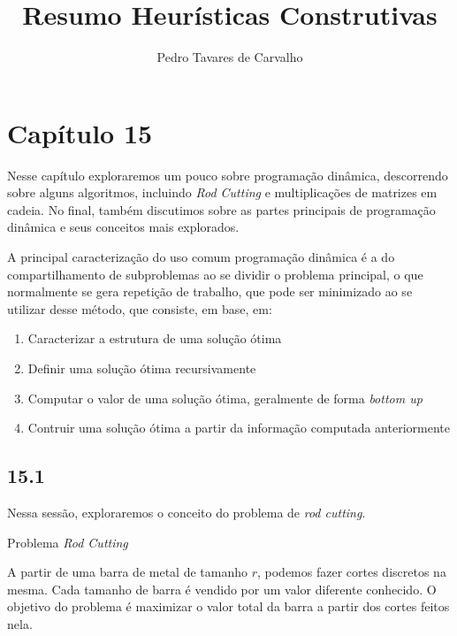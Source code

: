\documentclass[twocolumn]{article}
\title{Resumo Heurísticas Construtivas}
\author{Pedro Tavares de Carvalho}
\theoremstyle{mytheoremstyle}
\theoremstyle{mytheoremstyle}
\theoremstyle{myproblemstyle}
\begin{document}
    \maketitle
    \section{Capítulo 15} %

    \label{sec:Capítulo 15}
        Nesse capítulo exploraremos um pouco sobre programação dinâmica, descorrendo sobre alguns algoritmos,
        incluindo \emph{Rod Cutting} e multiplicações de matrizes em cadeia. No final, também discutimos sobre
        as partes principais de programação dinâmica e seus conceitos mais explorados.

        A principal caracterização do uso comum programação dinâmica é a do compartilhamento de subproblemas ao se dividir
        o problema principal, o que normalmente se gera repetição de trabalho, que pode ser minimizado ao se utilizar desse método,
        que consiste, em base, em:

        \begin{enumerate}
            \item Caracterizar a estrutura de uma solução ótima
            \item Definir uma solução ótima recursivamente
            \item Computar o valor de uma solução ótima, geralmente de forma \emph{bottom up}
            \item Contruir uma solução ótima a partir da informação computada anteriormente
        \end{enumerate}

        \subsection{15.1} %
        \label{sub:15.1}
            Nessa sessão, exploraremos o conceito do problema de \emph{rod cutting}.
            \begin{definition}
                Problema \emph{Rod Cutting}

                A partir de uma barra de metal de tamanho $r$, podemos fazer cortes discretos na mesma.
                Cada tamanho de barra é vendido por um valor diferente conhecido. O objetivo do problema é
                maximizar o valor total da barra a partir dos cortes feitos nela.

            \end{definition}
\end{document}
